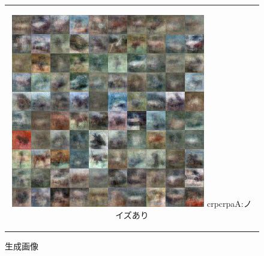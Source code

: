 \documentclass[12pt]{jsarticle}
\begin{document}
\begin{figure}[h]
\begin{center}
\begin{tabular}{c}
      \begin{minipage}{0.33\hsize}
        \begin{center}
          \includegraphics[clip, width=\linewidth]{train_ln250_mode_crpcrpaA_ln_300-dn_100_tn_100_noise_1.png}
          \hspace{0.2cm} crpcrpaA:ノイズあり
        \end{center}
      \end{minipage}


    \end{tabular}
    \caption{生成画像}
     \label{fig:accuracy}
  \end{center}
\end{figure}
\end{document}
